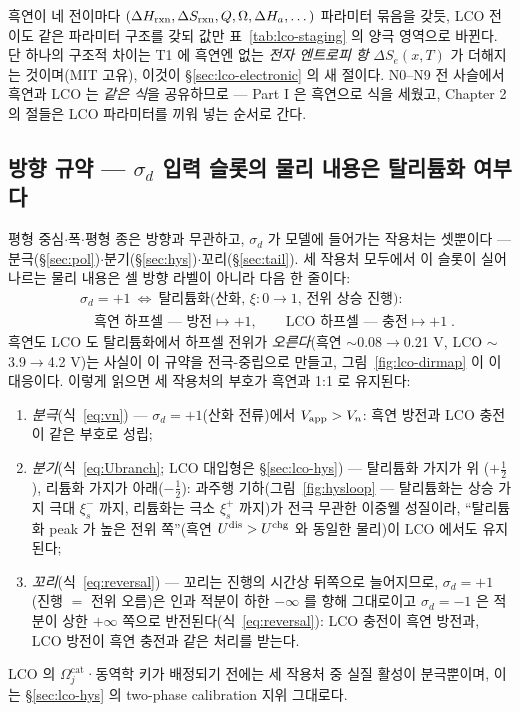 흑연이 네 전이마다 $(\Delta H_{\mathrm{rxn}},\Delta S_{\mathrm{rxn}},Q,\Omega,\Delta H_a,\dots)$ 파라미터 묶음을 갖듯,
LCO 전이도 같은 파라미터 구조를 갖되 값만 표~\ref{tab:lco-staging} 의 양극 영역으로 바뀐다. 단 하나의 구조적 차이는 T1 에
흑연엔 없는 \emph{전자 엔트로피 항} $\Delta S_e(x,T)$ 가 더해지는 것이며(MIT 고유), 이것이 \S\ref{sec:lco-electronic}
의 새 절이다. N0--N9 전 사슬에서 흑연과 LCO 는 \emph{같은 식}을 공유하므로 --- Part I 은 흑연으로 식을 세웠고,
Chapter 2 의 절들은 LCO 파라미터를 끼워 넣는 순서로 간다.

\subsection{방향 규약 --- $\sigma_d$ 입력 슬롯의 물리 내용은 탈리튬화 여부다}\label{sec:lco-direction}
평형 중심$\cdot$폭$\cdot$평형 종은 방향과 무관하고, $\sigma_d$ 가 모델에 들어가는 작용처는 셋뿐이다 ---
분극(\S\ref{sec:pol})$\cdot$분기(\S\ref{sec:hys})$\cdot$꼬리(\S\ref{sec:tail}). 세 작용처 모두에서 이 슬롯이
실어 나르는 물리 내용은 셀 방향 라벨이 아니라 다음 한 줄이다:
\begin{equation}
\boxed{\;\begin{aligned}
&\sigma_d=+1\ \Leftrightarrow\ \text{탈리튬화(산화, $\xi:0\!\to\!1$, 전위 상승 진행)}:\\
&\quad\text{흑연 하프셀 --- 방전}\mapsto+1,\qquad \text{LCO 하프셀 --- 충전}\mapsto+1\;.
\end{aligned}}
\label{eq:lco-sigmaslot}
\end{equation}
흑연도 LCO 도 탈리튬화에서 하프셀 전위가 \emph{오른다}(흑연 $\sim$0.08$\to$0.21 V, LCO
$\sim$3.9$\to$4.2 V)는 사실이 이 규약을 전극-중립으로 만들고, 그림~\ref{fig:lco-dirmap} 이 이 대응이다.
이렇게 읽으면 세 작용처의 부호가 흑연과 1:1 로 유지된다:
\begin{enumerate}[label=(\alph*),leftmargin=2.2em,itemsep=1pt]
\item \emph{분극}(식~\eqref{eq:vn}) --- $\sigma_d=+1$(산화 전류)에서 $V_{\mathrm{app}}>V_n$: 흑연 방전과 LCO 충전이
같은 부호로 성립;
\item \emph{분기}(식~\eqref{eq:Ubranch}; LCO 대입형은 \S\ref{sec:lco-hys}) --- 탈리튬화 가지가 위
($+\tfrac12$), 리튬화 가지가 아래($-\tfrac12$): 과주행 기하(그림~\ref{fig:hysloop} --- 탈리튬화는 상승
가지 극대 $\xi_s^-$ 까지, 리튬화는 극소 $\xi_s^+$ 까지)가 전극 무관한 이중웰 성질이라, ``탈리튬화 peak 가
높은 전위 쪽''(흑연 $U^{\mathrm{dis}}>U^{\mathrm{chg}}$ 와 동일한 물리)이 LCO 에서도 유지된다;
\item \emph{꼬리}(식~\eqref{eq:reversal}) --- 꼬리는 진행의 시간상 뒤쪽으로 늘어지므로, $\sigma_d=+1$
(진행 $=$ 전위 오름)은 인과 적분이 하한 $-\infty$ 를 향해 그대로이고 $\sigma_d=-1$ 은 적분이 상한 $+\infty$ 쪽으로
반전된다(식~\eqref{eq:reversal}): LCO 충전이 흑연 방전과, LCO 방전이 흑연 충전과 같은 처리를 받는다.
\end{enumerate}
LCO 의 $\Omega_j^\mathrm{cat}$·동역학 키가 배정되기 전에는 세 작용처 중 실질 활성이 분극뿐이며, 이는
\S\ref{sec:lco-hys} 의 two-phase calibration 지위 그대로다.


